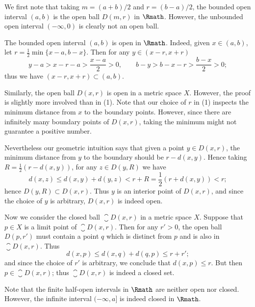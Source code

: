 \begin{example}
    \label{exm:opcl}
    We first note that
    taking \(m=(a+b)/2\) and \(r=(b-a)/2\),
    the bounded open interval \((a,b)\)
    is the open ball \(D(m,r)\) in \(\Rmath\).
    However, the unbounded open interval \((-\infty,0)\)
    is clearly not an open ball.
    \begin{nlist}
        \item The bounded open interval \((a,b)\) is open in \(\Rmath\).
        Indeed, given \(x\in(a,b)\),
        let \(r=\frac{1}{2}\min\{x-a,b-x\}\).
        Then for any \(y\in(x-r,x+r)\)
        \[
            y-a
            >x-r-a
            >\frac{x-a}{2}
            >0,
            \qquad
            b-y
            >b-x-r
            >\frac{b-x}{2}
            >0;
        \]
        thus we have \((x-r,x+r)\subset(a,b)\).
        
        \item Similarly,
        the open ball \(D(x,r)\) is open in a metric space \(X\).
        However, the proof is slightly more involved than in (1).
        Note that
        our choice of \(r\) in (1) inspects the minimum distance
        from \(x\) to the boundary points.
        However,
        since there are infinitely many boundary points of \(D(x,r)\),
        taking the minimum might not guarantee a positive number.
        
        Nevertheless our geometric intuition says that
        given a point \(y\in D(x,r)\),
        the minimum distance from \(y\) to the boundary
        should be \(r-d(x,y)\).
        Hence taking \(R=\frac{1}{2}(r-d(x,y))\),
        for any \(z\in D(y,R)\) we have
        \[
            d(x,z)
            \le d(x,y)+d(y,z)
            <r+R
            =\frac{1}{2}(r+d(x,y))
            <r;
        \]
        hence \(D(y,R)\subset D(x,r)\).
        Thus \(y\) is an interior point of \(D(x,r)\),
        and since the choice of \(y\) is arbitrary,
        \(D(x,r)\) is indeed open.

        \item Now we consider the closed ball \(\closure D(x,r)\)
        in a metric space \(X\).
        Suppose that \(p\in X\) is a limit point of \(\closure D(x,r)\).
        Then for any \(r'>0\),
        the open ball \(D(p,r')\) must contain a point \(q\)
        which is distinct from \(p\) and is also in \(\closure D(x,r)\).
        Thus
        \[
            d(x,p)
            \le d(x,q)+d(q,p)
            \le r+r';
        \]
        and since the choice of \(r'\) is arbitrary,
        we conclude that \(d(x,p)\le r\).
        But then \(p\in\closure D(x,r)\);
        thus \(\closure D(x,r)\) is indeed a closed set.

        \item Note that
        the finite half-open intervals in \(\Rmath\) are
        neither open nor closed.
        However, the infinite interval \((-\infty,a]\) is indeed
        closed in \(\Rmath\).
    \end{nlist}
\end{example}

